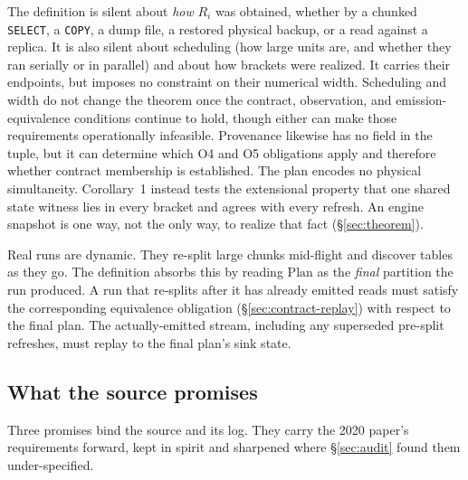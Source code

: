 \documentclass[sigconf,nonacm,10pt]{acmart}
\theoremstyle{plain}
\theoremstyle{definition}
\begin{document}
The definition is silent about \emph{how} $R_i$ was obtained, whether by a
chunked \texttt{SELECT}, a \texttt{COPY}, a dump file, a restored
physical backup, or a read against a replica. It is also silent about
scheduling (how large units are, and whether they ran serially or in
parallel) and about how brackets were realized. It carries their
endpoints, but imposes no constraint on their numerical width. Scheduling
and width do not change the theorem once the contract, observation,
and emission-equivalence conditions continue to hold, though either can
make those requirements operationally infeasible. Provenance likewise has
no field in the tuple, but it can determine which O4 and O5 obligations
apply and therefore whether contract membership is established. The
plan encodes no physical simultaneity. Corollary~1 instead tests the
extensional property that one shared state witness lies in every bracket
and agrees with every refresh. An engine snapshot is one way, not the
only way, to realize that fact (\S\ref{sec:theorem}).

Real runs are dynamic. They re-split large chunks mid-flight and
discover tables as they go. The definition absorbs this by reading
$\mathrm{Plan}$ as the \emph{final} partition the run produced. A
run that re-splits after it has already emitted reads must satisfy the
corresponding equivalence obligation
(\S\ref{sec:contract-replay}) with respect to the final plan. The
actually-emitted stream, including any superseded pre-split
refreshes, must replay to the final plan's sink state.

\subsection{What the source promises}\label{sec:contract-promises}

Three promises bind the source and its log. They carry the 2020 paper's requirements forward, kept in spirit and sharpened where \S\ref{sec:audit} found them under-specified.
\end{document}
